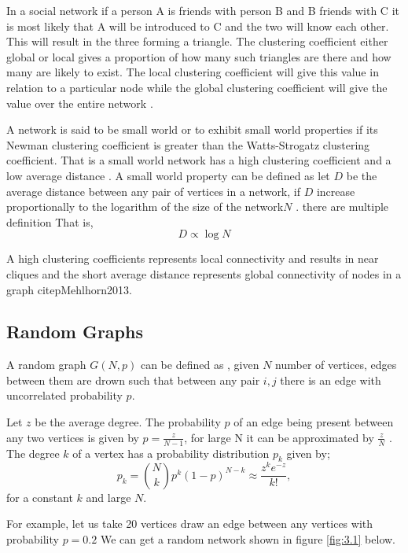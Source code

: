  
In a social network if a person A is friends with person B and B friends with C
it is most likely that A will be introduced to C and the two will know each other. This will result in the three forming a triangle. The clustering coefficient either global or local gives a proportion of how many such triangles are there and how many are likely to exist. The local  clustering coefficient will give this value in relation to a particular node while the global clustering coefficient will give the value over the entire network \citep{estrada2015first}.
 
A network is said to be small world or to exhibit small world properties if its Newman clustering coefficient is greater than the Watts-Strogatz clustering coefficient.
That is a small world network has a high clustering coefficient and a low average distance \citep{estrada2012structure}. A small world property can be defined as let $D$ be the average distance between any pair of vertices in a network, if $D$ increase proportionally to the logarithm of the size of the network$N$ \citep{newman1999scaling}.
  there are multiple definition
That is,
 \begin{equation}
 D \propto \log N
\end{equation}

A high clustering coefficients represents local connectivity and results in near cliques and the short average distance represents global connectivity of nodes in a graph  citep{Mehlhorn2013}.

 
\subsection{Random Graphs} 
A random graph $G(N,p)$ can be defined as , given  $N$ number of vertices, edges between them are drown such that between any pair $i,j$ there is an edge with uncorrelated probability $p$. 

 Let $z$  be the average degree. The probability $p$ of an edge being present between any two vertices is given by $p = \frac{z}{N-1}$, for large N it can be approximated by $\frac{z}{N}$ \citep{newman2002random}. The degree $k$ of a vertex has a probability distribution $p_k$ given by;
 \begin{equation}
 p_k = \binom{N}{k} p^k (1-p)^{N-k} \approx \frac{z^k e^{-z}}{k!},
\end{equation}
for  a constant $k$ and large $N$.

For example, let us take 20 vertices draw  an edge between any vertices with probability $p = 0.2$ We can get a random network shown in
figure
\ref{fig:3.1} below. 
  
